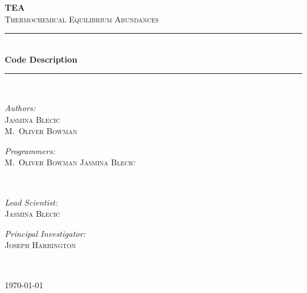 


\usepackage{epsfig}
\textwidth=6.5in
\textheight=9.5in
\topmargin=-0.75in
\oddsidemargin=0.0in
\evensidemargin=0.0in

\pagestyle{myheadings}



  


\begin{titlepage}
\begin{center}

\textsc{\huge \bfseries TEA}\\[0.5cm]
\textsc{\LARGE Thermochemical Equilibrium Abundances}\\[0.5cm]
\rule{250pt}{0.4pt} \\[0.4cm]
{ \huge \bfseries Code Description\\[0.4cm] }

\rule{250pt}{0.4pt} \\[1cm]

\begin{minipage}{0.4\textwidth}
\begin{flushleft} \large
\emph{Authors:}\\
 \textsc{Jasmina Blecic \\M.~Oliver Bowman}
\end{flushleft}
\end{minipage}
\begin{minipage}{0.4\textwidth}
\begin{flushright} \large
\emph{Programmers: } \\
\textsc{M.~Oliver Bowman Jasmina Blecic }
\end{flushright}
\end{minipage}\\[1.5cm]


\begin{minipage}{0.4\textwidth}
\begin{flushleft} \large
\emph{Lead Scientist:}\\
 \textsc{Jasmina Blecic}
\end{flushleft}
\end{minipage}
\begin{minipage}{0.4\textwidth}
\begin{flushright} \large
\emph{Principal Investigator:} \\
\textsc{Joseph Harrington}
\end{flushright}
\end{minipage}\\[.5cm]

\vfill

{\large \today}

\end{center}
\end{titlepage}


